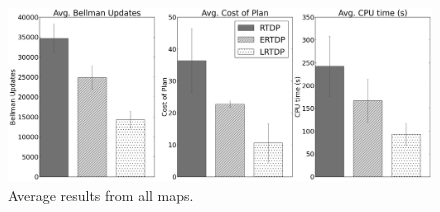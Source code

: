 \begin{figure}[t]
\centering
\includegraphics[width=0.3\linewidth]{figures/average_results_cropped.png}%
\caption{Average results from all maps.}
\label{fig:average_results}
\end{figure}

